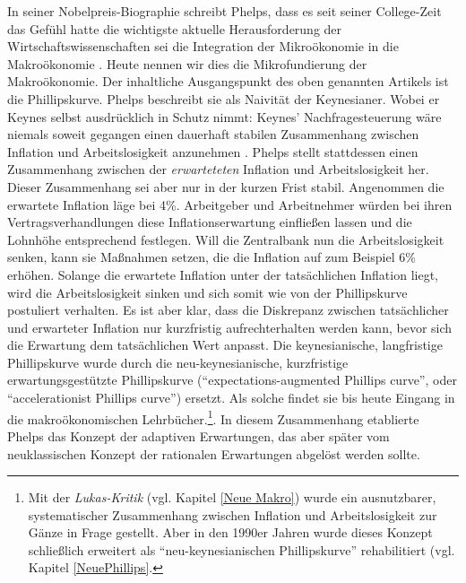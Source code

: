 In seiner Nobelpreis-Biographie schreibt Phelps, dass es seit seiner College-Zeit das Gefühl hatte die wichtigste aktuelle Herausforderung der Wirtschaftswissenschaften sei die Integration der Mikroökonomie in die Makroökonomie \parencite{Phelps2006}. Heute nennen wir dies die Mikrofundierung der Makroökonomie.
Der inhaltliche Ausgangspunkt des oben genannten Artikels \parencite{Phelps1968} ist die Phillipskurve. Phelps beschreibt sie als Naivität der Keynesianer. Wobei er Keynes selbst ausdrücklich in Schutz nimmt: Keynes' Nachfragesteuerung wäre niemals soweit gegangen einen dauerhaft stabilen Zusammenhang zwischen Inflation und Arbeitslosigkeit anzunehmen \parencite{Phelps2006}. Phelps stellt stattdessen einen Zusammenhang zwischen der \textit{erwarteteten} Inflation und Arbeitslosigkeit her. Dieser Zusammenhang sei aber nur in der kurzen Frist stabil. Angenommen die erwartete Inflation läge bei 4\%. Arbeitgeber und Arbeitnehmer würden bei ihren Vertragsverhandlungen diese Inflationserwartung einfließen lassen und die Lohnhöhe entsprechend festlegen. Will die Zentralbank nun die Arbeitslosigkeit senken, kann sie Maßnahmen setzen, die die Inflation auf zum Beispiel 6\% erhöhen. Solange die erwartete Inflation unter der tatsächlichen Inflation liegt, wird die Arbeitslosigkeit sinken und sich somit wie von der Phillipskurve postuliert verhalten. Es ist aber klar, dass die Diskrepanz zwischen tatsächlicher und erwarteter Inflation nur kurzfristig aufrechterhalten werden kann, bevor sich die Erwartung dem tatsächlichen Wert anpasst. Die keynesianische, langfristige Phillipskurve wurde durch die neu-keynesianische, kurzfristige erwartungsgestützte Phillipskurve ("`expectations-augmented Phillips curve"', oder "`accelerationist Phillips curve"') ersetzt. Als solche findet sie bis heute Eingang in die makroökonomischen Lehrbücher.\footnote{Mit der \textit{Lukas-Kritik} (vgl. Kapitel \ref{Neue Makro}) wurde ein ausnutzbarer, systematischer Zusammenhang zwischen Inflation und Arbeitslosigkeit zur Gänze in Frage gestellt. Aber  in den 1990er Jahren wurde dieses Konzept schließlich erweitert als "`neu-keynesianischen Phillipskurve"' rehabilitiert (vgl. Kapitel \ref{NeuePhillips}.}. In diesem Zusammenhang etablierte Phelps das Konzept der adaptiven Erwartungen, das aber später vom neuklassischen Konzept der rationalen Erwartungen abgelöst werden sollte.
